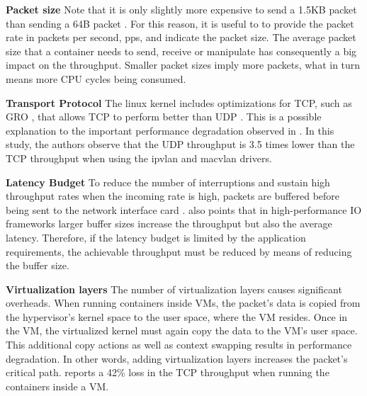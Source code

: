 \documentclass[conference]{IEEEtran}
\begin{document}
\noindent\textbf{Packet size}\hspace{0.2cm} 
Note that it is only slightly more expensive to send a 1.5KB packet than sending a 64B packet \cite{Rizzo:2012}. For this reason, it is useful to to provide the packet rate in packets per second, pps, and indicate the packet size. The average packet size that a container needs to send, receive or manipulate has consequently a big impact on the throughput. Smaller packet sizes imply more packets, what in turn means more CPU cycles being consumed.

\noindent\textbf{Transport Protocol}\hspace{0.2cm} 
The linux kernel includes optimizations for TCP, such as GRO \cite{GRO}, that allows TCP to perform better than UDP \cite{HotConNet_17:Zhao}. This is a possible explanation to the important performance degradation observed in \cite{NOMS_2016:Claasen}. In this study, the authors observe that the UDP throughput is 3.5 times lower than the TCP throughput when using the ipvlan and macvlan drivers.

\noindent\textbf{Latency Budget}\hspace{0.2cm}
To reduce the number of interruptions and sustain high throughput rates when the incoming rate is high,  packets are buffered before being sent to the network interface card \cite{DEBS_20:Stylianopoulos}. \cite{ANCS:Gallenmüller} also points that in high-performance IO frameworks larger buffer sizes increase the throughput but also the average latency. Therefore, if the latency budget is limited by the application requirements, the achievable throughput must be reduced by means of reducing the buffer size.

\noindent\textbf{Virtualization layers}\hspace{0.2cm}
The number of virtualization layers causes significant overheads. When running containers inside VMs, the packet's data is copied from the hypervisor's kernel space to the user space, where the VM resides. Once in the VM, the virtualized kernel must again copy the data to the VM’s user space. This additional copy actions as well as context swapping results in performance degradation. In other words, adding virtualization layers increases the packet's critical path. \cite{IEEE_INFOCOM_2018:K. Suo} reports a 42\% loss in the TCP throughput when running the containers inside a VM.
\end{document}
